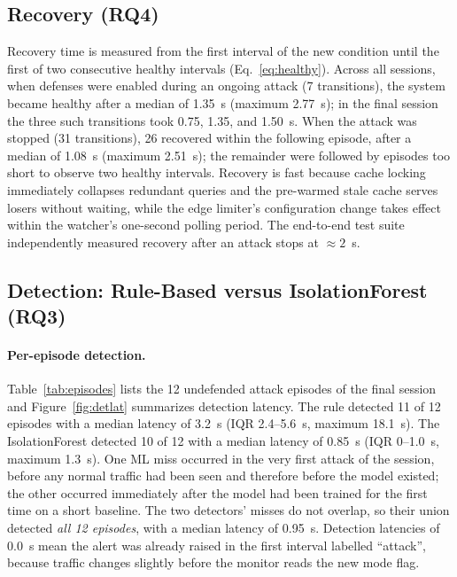 \documentclass[preprint,12pt]{elsarticle}
\begin{document}
\subsection{Recovery (RQ4)}
\label{sec:recovery}
Recovery time is measured from the first interval of the new condition until the first
of two consecutive healthy intervals (Eq.~\ref{eq:healthy}). Across all sessions,
when defenses were enabled during an ongoing attack (7 transitions), the system became
healthy after a median of 1.35~s (maximum 2.77~s); in the final session the three such
transitions took 0.75, 1.35, and 1.50~s. When the attack was stopped (31 transitions),
26 recovered within the following episode, after a median of 1.08~s (maximum 2.51~s);
the remainder were followed by episodes too short to observe two healthy intervals.
Recovery is fast because cache locking immediately collapses redundant queries and the
pre-warmed stale cache serves losers without waiting, while the edge limiter's
configuration change takes effect within the watcher's one-second polling period. The
end-to-end test suite independently measured recovery after an attack stops at
${\approx}2$~s.

\subsection{Detection: Rule-Based versus IsolationForest (RQ3)}
\label{sec:det-results}

\paragraph{Per-episode detection.} Table~\ref{tab:episodes} lists the 12 undefended
attack episodes of the final session and Figure~\ref{fig:detlat} summarizes detection
latency. The rule detected 11 of 12 episodes with a median latency of 3.2~s (IQR
2.4--5.6~s, maximum 18.1~s). The IsolationForest detected 10 of 12 with a median
latency of 0.85~s (IQR 0--1.0~s, maximum 1.3~s). One ML miss occurred in the very first
attack of the session, before any normal traffic had been seen and therefore before
the model existed; the other occurred immediately after the model had been trained
for the first time on a short baseline. The two detectors' misses do not overlap, so
their union detected \emph{all 12 episodes}, with a median latency of 0.95~s.
Detection latencies of 0.0~s mean the alert was already raised in the first interval
labelled ``attack'', because traffic changes slightly before the monitor reads the new
mode flag.
\end{document}

